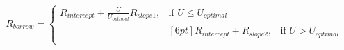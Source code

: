 \documentclass[preview]{standalone}
\begin{document}
\begin{align*}
R_{borrow} = 
                            \begin{cases}
                                R_{intercept} + \frac{U}{U_{optimal}}R_{slope1}, & \text{if } U \leq U_{optimal}\\
                                    &[6pt] R_{intercept} + R_{slope2}, & \text{if } U > U_{optimal}\\
                            \end{cases}
\end{align*}
\end{document}
